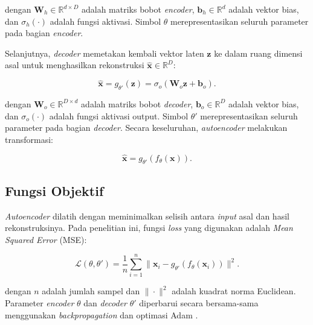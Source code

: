 \noindent dengan $\mathbf{W}_h \in \mathbb{R}^{d \times D}$ adalah matriks bobot
\textit{encoder}, $\mathbf{b}_h \in \mathbb{R}^d$ adalah vektor bias, dan
$\sigma_h(\cdot)$ adalah fungsi aktivasi. Simbol $\theta$
merepresentasikan seluruh parameter pada bagian \textit{encoder}.

Selanjutnya, \textit{decoder} memetakan kembali vektor laten $\mathbf{z}$
ke dalam ruang dimensi asal untuk menghasilkan rekonstruksi
$\hat{\mathbf{x}} \in \mathbb{R}^D$:

\begin{equation}
    \hat{\mathbf{x}} = g_{\theta'}(\mathbf{z}) =
    \sigma_o(\mathbf{W}_o \mathbf{z} + \mathbf{b}_o).
    \label{eq:decoder}
\end{equation}

\noindent dengan $\mathbf{W}_o \in \mathbb{R}^{D \times d}$ adalah matriks bobot
\textit{decoder}, $\mathbf{b}_o \in \mathbb{R}^D$ adalah vektor bias, dan
$\sigma_o(\cdot)$ adalah fungsi aktivasi output. Simbol $\theta'$
merepresentasikan seluruh parameter pada bagian \textit{decoder}. Secara
keseluruhan, \textit{autoencoder} melakukan transformasi:

\begin{equation}
    \hat{\mathbf{x}} = g_{\theta'}(f_\theta(\mathbf{x})).
    \label{eq:autoencoder_full}
\end{equation}

\subsection{Fungsi Objektif}

\textit{Autoencoder} dilatih dengan meminimalkan selisih antara
\textit{input} asal dan hasil rekonstruksinya. Pada penelitian ini,
fungsi \textit{loss} yang digunakan adalah \textit{Mean Squared Error}
(MSE):

\begin{equation}
    \mathcal{L}(\theta, \theta') = \frac{1}{n} \sum_{i=1}^{n}
    \|\mathbf{x}_i - g_{\theta'}(f_\theta(\mathbf{x}_i))\|^2.
    \label{eq:reconstruction_loss}
\end{equation}

\noindent dengan $n$ adalah jumlah sampel dan $\|\cdot\|^2$ adalah kuadrat norma
Euclidean. Parameter \textit{encoder} $\theta$ dan \textit{decoder}
$\theta'$ diperbarui secara bersama-sama menggunakan
\textit{backpropagation} dan optimasi Adam \parencite{vincent2010stacked}.

